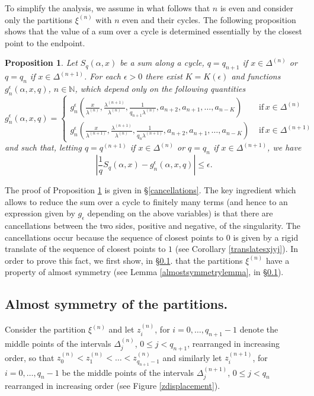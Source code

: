\documentclass{conm-p-l}
\numberwithin{equation}{section}
\newtheorem{prop}[theorem]{Proposition}
\begin{document}
To simplify the analysis, we assume in what follows that $n$ is even
and consider only the partitions  $\xi^{(n)}$ with $n$ even and their cycles.
The following proposition shows that the value of a sum over a cycle is
determined essentially by the closest point to the endpoint.
\begin{prop}\label{cycleprop} Let  ${S_{{q}}({\alpha}, {x})}$ be a sum along a cycle,
$q=q_{n+1}$ if $x\in \Delta^{(n)}$ or $q=q_{n}$ if  $x\in \Delta^{(n+1)}$.
For each $\epsilon>0$ there exist $K=K(\epsilon)$ and
functions $g_n^{\epsilon}(\alpha, {x}, q)$, $n\in \mathbb{N}$, which depend
only on the following quantities
\begin{equation}\label{gdependence}
g_n^{\epsilon}  (\alpha, {x}, q) = \left\{ \begin{array}{ll} g_n^{\epsilon}
\left( \frac{{x}}{\lambda^{(n)}},  \frac{\lambda^{(n+1)}}{\lambda^{(n)} },
\frac{1}{q_{n+1} \lambda^{(n)} },  a_{n+2}, a_{n+1},
 \dots, a_{n- K} \right) 
& \, \,   \mathrm{if}\, {x}\in  \Delta^{(n)} 
\\g_n^{\epsilon}
\left( \frac{{x}}{\lambda^{(n+1)}},  \frac{\lambda^{(n+1)}}{\lambda^{(n)} },
\frac{1}{q_{n} \lambda^{(n+1)} },  a_{n+2}, a_{n+1},
 \dots, a_{n- K} \right) 
& \, \, \mathrm{if}\, {x}\in  \Delta^{(n+1)} 
\end{array} \right.
\end{equation}
and such that,
letting $q=q^{(n+1)}$ if $x\in \Delta^{(n)}$ or $q=q_{n}$ if  $x\in \Delta^{(n+1)}$, 
we have
\begin{equation}\label{gapproximates}
\left| \frac{1}{q}  {S_{{q}}({\alpha}, {{x}})} - g_n^{\epsilon} (\alpha, {x}, q)
\right| \leq 
 \epsilon.
\end{equation}
\end{prop}
The proof of Proposition \ref{cycleprop} is given in \S\ref{cancellations}. The
key ingredient which allows to reduce the sum over a cycle to finitely many terms
(and hence to an expression given by  $g_\epsilon$ depending on the above
variables) is that there are cancellations between the two sides, positive and
negative, of the singularity. The cancellations occur because the sequence of
closest points to $0$ is given by a rigid translate of the sequence of closest
points to $1$ (see Corollary \ref{translatesxjyj}). In order to prove this fact,
we first show, in \S\ref{almostsymmetry}. that the partitions $\xi^{(n)}$ have a
property of almost symmetry (see Lemma \ref{almostsymmetrylemma}, in \S\ref{almostsymmetry}).

\subsection{ Almost symmetry of  the partitions.}\label{almostsymmetry}
Consider the partition $\xi^{(n)}$
and let $z^{(n)}_i$, for $i=0,\dots, q_{n+1}-1$ denote the middle points of the
intervals $\Delta^{(n)}_j$, $0\leq j < q_{n+1}$, rearranged in increasing order,
so that  $z^{(n)}_0< z^{(n)}_1<\dots < z^{(n)}_{q_{n+1}-1}$ and similarly let
$z^{(n+1)}_i$, for $i=0,\dots, q_{n}-1$ be the middle points of the intervals
$\Delta^{(n+1)}_j$, $0\leq j < q_{n}$ rearranged in increasing order (see Figure \ref{zdisplacement}).
\end{document}
